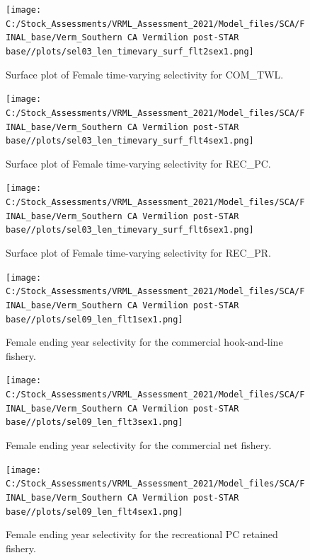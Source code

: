 \documentclass[11pt,
  english,
]{article}
\begin{document}
\begin{figure}
\centering
\texttt{[image: C:/Stock\_Assessments/VRML\_Assessment\_2021/Model\_files/SCA/FINAL\_base/Verm\_Southern CA Vermilion post-STAR base//plots/sel03\_len\_timevary\_surf\_flt2sex1.png]}
\caption{Surface plot of Female time-varying selectivity for COM\_TWL.\label{fig:sel03_len_timevary_surf_flt2sex1}}
\end{figure}

\begin{figure}
\centering
\texttt{[image: C:/Stock\_Assessments/VRML\_Assessment\_2021/Model\_files/SCA/FINAL\_base/Verm\_Southern CA Vermilion post-STAR base//plots/sel03\_len\_timevary\_surf\_flt4sex1.png]}
\caption{Surface plot of Female time-varying selectivity for REC\_PC.\label{fig:sel03_len_timevary_surf_flt4sex1}}
\end{figure}

\begin{figure}
\centering
\texttt{[image: C:/Stock\_Assessments/VRML\_Assessment\_2021/Model\_files/SCA/FINAL\_base/Verm\_Southern CA Vermilion post-STAR base//plots/sel03\_len\_timevary\_surf\_flt6sex1.png]}
\caption{Surface plot of Female time-varying selectivity for REC\_PR.\label{fig:sel03_len_timevary_surf_flt6sex1}}
\end{figure}

\FloatBarrier

\FloatBarrier

\begin{figure}
\centering
\texttt{[image: C:/Stock\_Assessments/VRML\_Assessment\_2021/Model\_files/SCA/FINAL\_base/Verm\_Southern CA Vermilion post-STAR base//plots/sel09\_len\_flt1sex1.png]}
\caption{Female ending year selectivity for the commercial hook-and-line fishery.\label{fig:endyr-selex-COM-HKL}}
\end{figure}

\begin{figure}
\centering
\texttt{[image: C:/Stock\_Assessments/VRML\_Assessment\_2021/Model\_files/SCA/FINAL\_base/Verm\_Southern CA Vermilion post-STAR base//plots/sel09\_len\_flt3sex1.png]}
\caption{Female ending year selectivity for the commercial net fishery.\label{fig:endyr-selex-COM-NET}}
\end{figure}

\begin{figure}
\centering
\texttt{[image: C:/Stock\_Assessments/VRML\_Assessment\_2021/Model\_files/SCA/FINAL\_base/Verm\_Southern CA Vermilion post-STAR base//plots/sel09\_len\_flt4sex1.png]}
\caption{Female ending year selectivity for the recreational PC retained fishery.\label{fig:endyr-selex-REC-PC}}
\end{figure}
\end{document}

